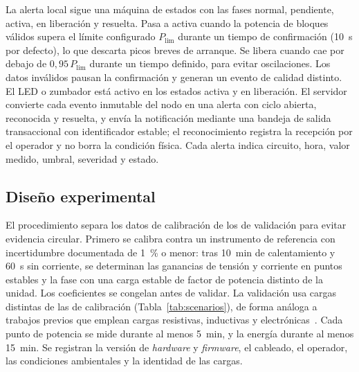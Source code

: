 La alerta local sigue una máquina de estados con las fases normal, pendiente, activa, en liberación y resuelta.
Pasa a activa cuando la potencia de bloques válidos supera el límite configurado $P_{\mathrm{lim}}$ durante un tiempo de confirmación (\SI{10}{s} por defecto), lo que descarta picos breves de arranque.
Se libera cuando cae por debajo de $0{,}95\,P_{\mathrm{lim}}$ durante un tiempo definido, para evitar oscilaciones.
Los datos inválidos pausan la confirmación y generan un evento de calidad distinto.
El LED o zumbador está activo en los estados activa y en liberación.
El servidor convierte cada evento inmutable del nodo en una alerta con ciclo abierta, reconocida y resuelta, y envía la notificación mediante una bandeja de salida transaccional con identificador estable; el reconocimiento registra la recepción por el operador y no borra la condición física.
Cada alerta indica circuito, hora, valor medido, umbral, severidad y estado.

\subsection{Diseño experimental}
\label{sec:experimental}
El procedimiento separa los datos de calibración de los de validación para evitar evidencia circular.
Primero se calibra contra un instrumento de referencia con incertidumbre documentada de \SI{1}{\percent} o menor: tras \SI{10}{min} de calentamiento y \SI{60}{s} sin corriente, se determinan las ganancias de tensión y corriente en puntos estables y la fase con una carga estable de factor de potencia distinto de la unidad.
Los coeficientes se congelan antes de validar.
La validación usa cargas distintas de las de calibración (Tabla~\ref{tab:scenarios}), de forma análoga a trabajos previos que emplean cargas resistivas, inductivas y electrónicas~\cite{cardenas2026residential}.
Cada punto de potencia se mide durante al menos \SI{5}{min}, y la energía durante al menos \SI{15}{min}.
Se registran la versión de \textit{hardware} y \textit{firmware}, el cableado, el operador, las condiciones ambientales y la identidad de las cargas.

